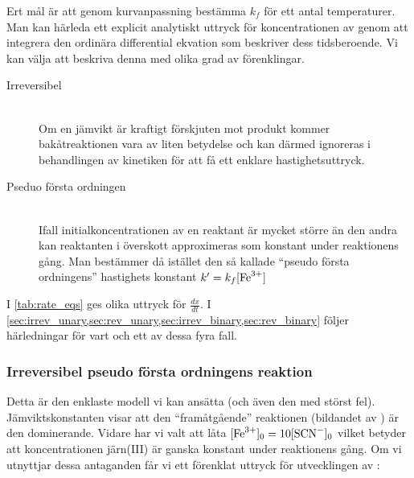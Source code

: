 Ert mål är att genom kurvanpassning bestämma $k_f$ för ett antal temperaturer.
Man kan härleda ett explicit analytiskt uttryck för koncentrationen
av  genom att integrera den ordinära differential ekvation
som beskriver dess tidsberoende. Vi kan välja att beskriva denna med
olika grad av förenklingar.
\begin{description}
\item[Irreversibel] \hfill \\
  Om en jämvikt är kraftigt förskjuten mot produkt kommer
  bakåtreaktionen vara av liten betydelse och kan därmed
  ignoreras i behandlingen av kinetiken för att få
  ett enklare hastighetsuttryck.
\item[Pseduo första ordningen] \hfill \\ %
  Ifall initialkoncentrationen av en reaktant är mycket större än den andra
  kan reaktanten i överskott approximeras som konstant under reaktionens
  gång. Man bestämmer då istället den så kallade ``pseudo första ordningens''
  hastighets konstant $k' = k_f[\ce{Fe^3+}]$
\end{description}



I \cref{tab:rate_eqs} ges olika uttryck för $\frac{dx}{dt}$. I
\cref{sec:irrev_unary,sec:rev_unary,sec:irrev_binary,sec:rev_binary} 
följer härledningar för vart och ett av dessa fyra fall. 






\subsubsection{Irreversibel pseudo första ordningens reaktion}
\label{sec:irrev_unary}
Detta är den enklaste modell vi kan ansätta (och även den med störst fel).
Jämviktskonstanten visar att den ``framåtgående'' reaktionen (bildandet av )
är den dominerande. Vidare har vi valt att låta $[\ce{Fe^3+}]_0=10[\ce{SCN-}]_0$ vilket
betyder att koncentrationen järn(III) är ganska konstant under reaktionens gång. Om vi
utnyttjar dessa antaganden får vi ett förenklat uttryck för utvecklingen
av :

